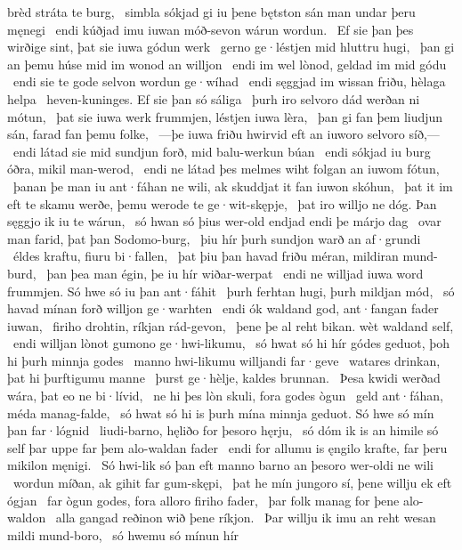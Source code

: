 brèd stráta te burg, \hld\ simbla sókjad gi iu þene bętston sán
man undar þeru męnegi \hld\ endi kúðjad imu iuwan móð-sevon
wárun wordun. \hld\ Ef sie þan þes wirðige sint,
þat sie iuwa gódun werk \hld\ gerno ge·léstjen
mid hluttru hugi, \hld\ þan gi an þemu húse mid im
wonod an willjon \hld\ endi im wel lònod,
geldad im mid gódu \hld\ endi sie te gode selvon
wordun ge·wíhad \hld\ endi sęggjad im wissan friðu,
hèlaga helpa \hld\ heven-kuninges.
Ef sie þan só sáliga \hld\ þurh iro selvoro dád
werðan ni mótun, \hld\ þat sie iuwa werk frummjen,
léstjen iuwa lèra, \hld\ þan gi fan þem liudjun sán,
farad fan þemu folke, \hld\ —þe iuwa friðu hwirvid
eft an iuworo selvoro síð,— \hld\ endi látad sie mid sundjun forð,
mid balu-werkun búan \hld\ endi sókjad iu burg óðra,
mikil man-werod, \hld\ endi ne látad þes melmes wiht
folgan an iuwom fótun, \hld\ þanan þe man iu ant·fáhan ne wili,
ak skuddjat it fan iuwon skóhun, \hld\ þat it im eft te skamu werðe,
þemu werode te ge·wit-skępje, \hld\ þat iro willjo ne dóg.
Þan sęggjo ik iu te wárun, \hld\ só hwan só þius wer-old endjad
endi þe márjo dag \hld\ ovar man farid,
þat þan Sodomo-burg, \hld\ þiu hír þurh sundjon warð
an af·grundi \hld\ éldes kraftu,
fiuru bi·fallen, \hld\ þat þiu þan havad friðu méran,
mildiran mund-burd, \hld\ þan þea man égin,
þe iu hír wiðar-werpat \hld\ endi ne willjad iuwa word frummjen.
Só hwe só iu þan ant·fáhit \hld\ þurh ferhtan hugi,
þurh mildjan mód, \hld\ só havad mínan forð
willjon ge·warhten \hld\ endi ók waldand god,
ant·fangan fader iuwan, \hld\ firiho drohtin,
ríkjan rád-gevon, \hld\ þene þe al reht bikan.
wèt waldand self, \hld\ endi willjan lònot
gumono ge·hwi-likumu, \hld\ só hwat só hi hír gódes geduot,
þoh hi þurh minnja godes \hld\ manno hwi-likumu
willjandi far·geve \hld\ watares drinkan,
þat hi þurftigumu manne \hld\ þurst ge·hèlje,
kaldes brunnan. \hld\ Þesa kwidi werðad wára,
þat eo ne bi·lívid, \hld\ ne hi þes lòn skuli,
fora godes ògun \hld\ geld ant·fáhan,
méda manag-falde, \hld\ só hwat só hi is þurh mína minnja geduot.
Só hwe só mín þan far·lógnid \hld\ liudi-barno,
hęliðo for þesoro hęrju, \hld\ só dóm ik is an himile só self
þar uppe far þem alo-waldan fader \hld\ endi for allumu is ęngilo krafte,
far þeru mikilon męnigi. \hld\ Só hwi-lik só þan eft manno barno
an þesoro wer-oldi ne wili \hld\ wordun míðan,
ak gihit far gum-skępi, \hld\ þat he mín jungoro sí,
þene willju ek eft ógjan \hld\ far ògun godes,
fora alloro firiho fader, \hld\ þar folk manag
for þene alo-waldon \hld\ alla gangad
reðinon wið þene ríkjon. \hld\ Þar willju ik imu an reht wesan
mildi mund-boro, \hld\ só hwemu só mínun hír
